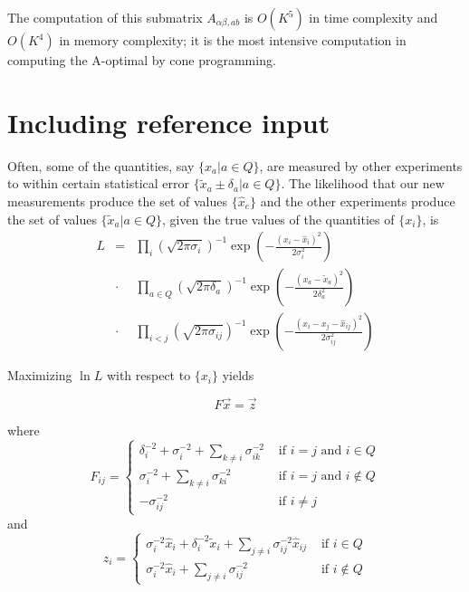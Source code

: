 \documentclass{article}
\begin{document}
The computation of this submatrix $A_{\alpha\beta,ab}$ is $O(K^5)$ in
time complexity and $O(K^4)$ in memory complexity; it is the most
intensive computation in computing the A-optimal by cone programming.

\section{Including reference input}

Often, some of the quantities, say $\{x_a|a\in Q\}$, are measured by
other experiments to within certain statistical error $\{\tilde{x}_a
\pm \delta_a|a\in Q\}$. The likelihood that our new measurements
produce the set of values $\{ \hat{x}_e \}$ and the other experiments
produce the set of values $\{ \tilde{x}_a | a\in Q\}$, given the true
values of the quantities of $\{ x_i \}$, is
\begin{eqnarray}
L &=& \prod_i (\sqrt{2\pi \sigma_i})^{-1} 
  \exp\left( -\frac{(x_i - \hat{x}_i)^2}{2\sigma_i^2} \right)
\nonumber \\
  &\cdot& \prod_{a\in Q} (\sqrt{2\pi \delta_a})^{-1}
  \exp\left( -\frac{(x_a - \tilde{x}_a)^2}{2\delta_a^2} \right)
\nonumber \\
  &\cdot& \prod_{i<j} (\sqrt{2\pi \sigma_{ij}})^{-1}
  \exp\left( -\frac{(x_i - x_j - \hat{x}_{ij})^2}{2\sigma_{ij}^2}\right)
\label{eq:likelihood}
\end{eqnarray}

Maximizing $\ln L$ with respect to $\{ x_i \}$ yields

\begin{equation}
F \vec{x} = \vec{z}
\end{equation}

where
\begin{equation}
F_{ij} = \left\{
\begin{array}{cl}
\delta_i^{-2} + \sigma_i^{-2} + \sum_{k\neq i} \sigma_{ik}^{-2} & \text{ if } i = j \text{ and } i\in Q \\
\sigma_i^{-2} + \sum_{k\neq i} \sigma_{ki}^{-2} & \text{ if } i=j \text{ and } i\notin Q \\
-\sigma_{ij}^{-2} & \text{ if } i\neq j
\end{array}
\right.
\label{eq:Fisher-information-matrix}
\end{equation}
and
\begin{equation}
z_i = \left\{
\begin{array}{cl}
\sigma_i^{-2} \hat{x}_i + \delta_i^{-2} \tilde{x}_i + \sum_{j\neq i}\sigma_{ij}^{-2} \hat{x}_{ij} & \text{ if } i \in Q \\
\sigma_i^{-2} \hat{x}_i + \sum_{j\neq i}\sigma_{ij}^{-2} & \text{ if } i \notin Q
\end{array}
\right.
\end{equation}
\end{document}
